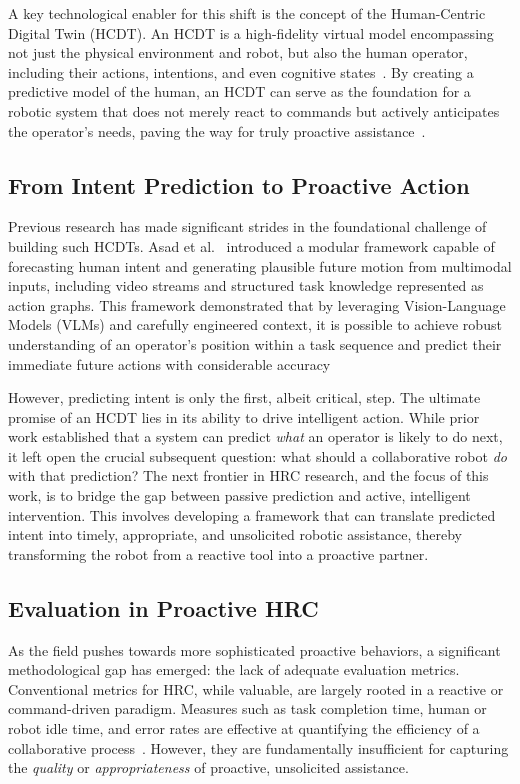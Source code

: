 \documentclass[sensors,article,submit,pdftex,moreauthors]{Definitions/mdpi}
\begin{document}
A key technological enabler for this shift is the concept of the Human-Centric Digital Twin (HCDT). An HCDT is a high-fidelity virtual model encompassing not just the physical environment and robot, but also the human operator, including their actions, intentions, and even cognitive states~\cite{Polini2020}. By creating a predictive model of the human, an HCDT can serve as the foundation for a robotic system that does not merely react to commands but actively anticipates the operator's needs, paving the way for truly proactive assistance~\cite{Polini2020}.

\subsection{From Intent Prediction to Proactive Action}

Previous research has made significant strides in the foundational challenge of building such HCDTs. Asad et al.~\cite{Asad2024_intention} introduced a modular framework capable of forecasting human intent and generating plausible future motion from multimodal inputs, including video streams and structured task knowledge represented as action graphs. This framework demonstrated that by leveraging Vision-Language Models (VLMs) and carefully engineered context, it is possible to achieve robust understanding of an operator's position within a task sequence and predict their immediate future actions with considerable accuracy~\cite{Asad2024_intention}

However, predicting intent is only the first, albeit critical, step. The ultimate promise of an HCDT lies in its ability to drive intelligent action. While prior work established that a system can predict \textit{what} an operator is likely to do next, it left open the crucial subsequent question: what should a collaborative robot \textit{do} with that prediction? The next frontier in HRC research, and the focus of this work, is to bridge the gap between passive prediction and active, intelligent intervention. This involves developing a framework that can translate predicted intent into timely, appropriate, and unsolicited robotic assistance, thereby transforming the robot from a reactive tool into a proactive partner.

\subsection{Evaluation in Proactive HRC}

As the field pushes towards more sophisticated proactive behaviors, a significant methodological gap has emerged: the lack of adequate evaluation metrics. Conventional metrics for HRC, while valuable, are largely rooted in a reactive or command-driven paradigm. Measures such as task completion time, human or robot idle time, and error rates are effective at quantifying the efficiency of a collaborative process~\cite{Umbrico2022}. However, they are fundamentally insufficient for capturing the \textit{quality} or \textit{appropriateness} of proactive, unsolicited assistance.
\end{document}
